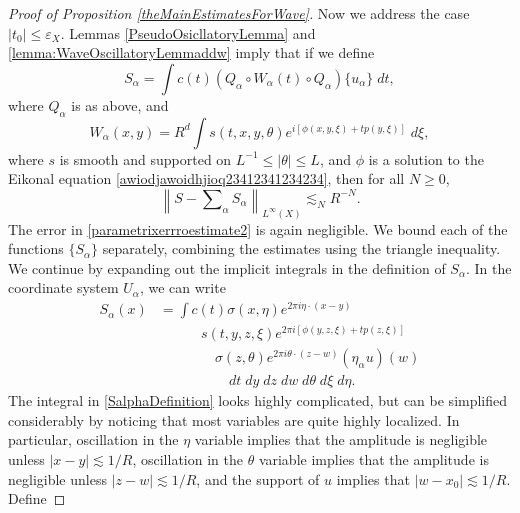 \begin{proof}[Proof of Proposition \ref{theMainEstimatesForWave}]
Now we address the case $|t_0| \leq \varepsilon_X$. Lemmas \ref{PseudoOsicllatoryLemma} and \ref{lemma:WaveOscillatoryLemmaddw} imply that if we define
%
\begin{equation}
    S\!_\alpha = \int c(t) (Q_\alpha \circ W_\alpha(t) \circ Q_\alpha) \{ u_\alpha \}\; dt,
\end{equation}
%
where $Q_\alpha$ is as above, and
%
\[ W_\alpha(x,y) = R^d \int s(t,x,y,\theta) e^{i [ \phi(x,y,\xi) + t p(y,\xi) ]}\; d\xi, \]
%
where $s$ is smooth and supported on $L^{-1} \leq |\theta| \leq L$, and $\phi$ is a solution to the Eikonal equation \eqref{awiodjawoidhjioq23412341234234}, then for all $N \geq 0$,
%
\begin{equation} \label{parametrixerrroestimate2}
    \left\| S - \textstyle\sum\nolimits_\alpha S\!_\alpha \right\|_{L^\infty(X)} \lesssim_N R^{-N}.
\end{equation}
%
%
%
The error in \eqref{parametrixerrroestimate2} is again negligible. We bound each of the functions $\{ S\!_\alpha \}$ separately, combining the estimates using the triangle inequality. We continue by expanding out the implicit integrals in the definition of $S\!_\alpha$. In the coordinate system $U_\alpha$, we can write
%
\begin{equation} \label{SalphaDefinition}
\begin{split}
    S\!_\alpha(x) &= \int c(t) \sigma(x,\eta) e^{2 \pi i \eta \cdot (x - y)}\\[-6 pt]
    &\quad\quad\quad s(t,y,z,\xi) e^{2 \pi i [ \phi(y,z,\xi) + t p(z,\xi) ]}\\
    &\quad\quad\quad\quad \sigma(z,\theta) e^{2 \pi i \theta \cdot (z - w)} (\eta_\alpha u)(w)\\
    &\quad\quad\quad\quad\quad dt\; dy\; dz\; dw\; d\theta\; d\xi\; d\eta.
\end{split}
\end{equation}
%
The integral in \eqref{SalphaDefinition} looks highly complicated, but can be simplified considerably by noticing that most variables are quite highly localized. In particular, oscillation in the $\eta$ variable implies that the amplitude is negligible unless $|x - y| \lesssim 1/R$, oscillation in the $\theta$ variable implies that the amplitude is negligible unless $|z - w| \lesssim 1/R$, and the support of $u$ implies that $|w - x_0| \lesssim 1/R$. Define

\end{proof}
